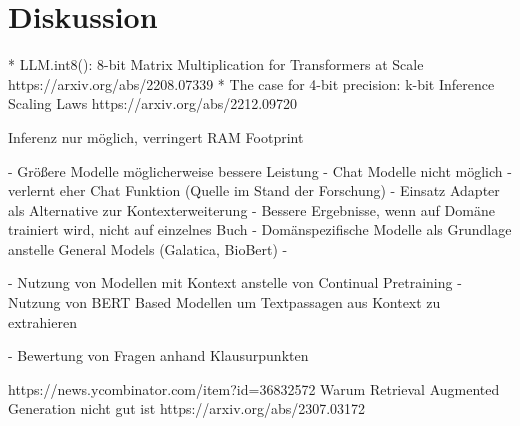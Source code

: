 \chapter{Diskussion}\label{ch:discussion}

* LLM.int8(): 8-bit Matrix Multiplication for Transformers at Scale https://arxiv.org/abs/2208.07339
* The case for 4-bit precision: k-bit Inference Scaling Laws https://arxiv.org/abs/2212.09720

Inferenz nur möglich, verringert RAM Footprint

- Größere Modelle möglicherweise bessere Leistung
- Chat Modelle nicht möglich - verlernt eher Chat Funktion (Quelle im Stand der Forschung)
- Einsatz Adapter als Alternative zur Kontexterweiterung
- Bessere Ergebnisse, wenn auf Domäne trainiert wird, nicht auf einzelnes Buch
- Domänspezifische Modelle als Grundlage anstelle General Models (Galatica, BioBert)
- 

- Nutzung von Modellen mit Kontext anstelle von Continual Pretraining
- Nutzung von BERT Based Modellen um Textpassagen aus Kontext zu extrahieren

- Bewertung von Fragen anhand Klausurpunkten


https://news.ycombinator.com/item?id=36832572
Warum Retrieval Augmented Generation nicht gut ist 
https://arxiv.org/abs/2307.03172

